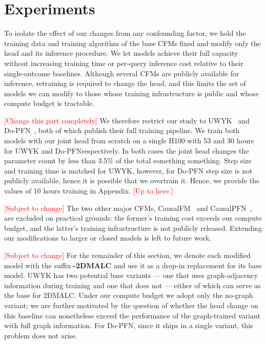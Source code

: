 \documentclass[11pt]{article}
\begin{document}
\section{Experiments}
\label{sec:results}

To isolate the effect of our changes from any confounding factor, we
hold the training data and training algorithm of the base CFMs
fixed and modify only the head and its inference procedure. We let models achieve their full capacity without increasing training
time or per-query inference cost relative to their single-outcome
baselines. Although several CFMs are publicly available for
inference, retraining is required to change the head, and this
limits the set of models we can modify to those whose training
infrastructure is public and whose compute budget is tractable.


\textcolor{red}{[Change this part completely]} We therefore restrict our study to UWYK~\citep{UWYK} and Do-PFN~\citep{dopfn}, both of which publish their full training pipeline. We train both models with our joint head from scratch on a single H100 with 53 and 30 hours for UWYK and Do-PFNrespectively. In both cases the joint head changes the parameter count by less than 3.5\% of the total something something. Step size and training time is matched for UWYK, however, for Do-PFN step size is not publicly available, hence it is possible that we overtrain it. Hence, we provide the values of 10 hours training in Appendix.  \textcolor{red}{[Up to here.]}


\textcolor{red}{[Subject to change]} The two other major CFMs, CausalFM~\citep{ma2026causalfm} and CausalPFN~\citep{causalpfn}, are excluded on practical grounds: the
former's training cost exceeds our compute budget, and the
latter's training infrastructure is not publicly released. Extending our modifications to larger or closed models is left to future work.

\textcolor{red}{[Subject to change]} For the remainder of this section, we denote each modified model
with the suffix \textbf{-2DMALC} and use it as a drop-in replacement
for its base model. UWYK has two potential base variants — one that uses
graph-adjacency information during training and one that does not —
either of which can serve as the base for 2DMALC. Under our compute
budget we adopt only the no-graph variant; we are further motivated by the question of whether the head change on this baseline can nonetheless exceed the performance of the graph-trained variant with full graph information. For Do-PFN, since it ships in a single variant, this problem does not arise.
\end{document}
